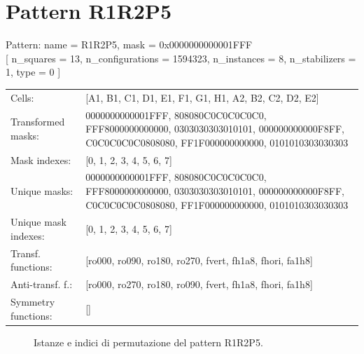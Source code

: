 \newpage

\section{Pattern R1R2P5}

\begin{tcolorbox}[sharp corners, fontupper=\ttfamily\small, colback=white]
  \noindent Pattern: name = R1R2P5, mask = 0x0000000000001FFF\\
  {[} n\_squares = 13, n\_configurations = 1594323,
  n\_instances = 8, n\_stabilizers = 1, type = 0 { ]}\\[1.0ex]
  \begin{tabularx}{\textwidth}{@{} p{3.5cm} X @{}}
    Cells:               & {[}A1, B1, C1, D1, E1, F1, G1, H1, A2, B2, C2, D2, E2{]}\\[0.5ex]
    Transformed masks:   & 0000000000001FFF, 808080C0C0C0C0C0, FFF8000000000000, 0303030303010101, 000000000000F8FF, C0C0C0C0C0808080, FF1F000000000000, 0101010303030303\\[0.5ex]
    Mask indexes:        & {[}0, 1, 2, 3, 4, 5, 6, 7{]}\\[0.5ex]
    Unique masks:        & 0000000000001FFF, 808080C0C0C0C0C0, FFF8000000000000, 0303030303010101, 000000000000F8FF, C0C0C0C0C0808080, FF1F000000000000, 0101010303030303\\[0.5ex]
    Unique mask indexes: & {[}0, 1, 2, 3, 4, 5, 6, 7{]}\\[0.5ex]
    Transf. functions:   & {[}ro000, ro090, ro180, ro270, fvert, fh1a8, fhori, fa1h8{]}\\[0.5ex]
    Anti-transf. f.:     & {[}ro000, ro270, ro180, ro090, fvert, fh1a8, fhori, fa1h8{]}\\[0.5ex]
    Symmetry functions:  & {[}{]}\\[0.5ex]
  \end{tabularx}
\end{tcolorbox}

\begin{figure}[htbp]
  \centering
   \hfill
   \hfill
   \hfill
  \vspace{0.3cm}
   \hfill
   \hfill
   \hfill
  \caption{Istanze e indici di permutazione del pattern R1R2P5.}
\end{figure}

